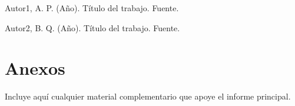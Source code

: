 \documentclass[12pt,a4paper]{article} \usepackage[spanish]{babel} \usepackage{graphicx} \usepackage{amsmath} \usepackage{amsfonts} \usepackage{amssymb} \usepackage{float} \usepackage{geometry}
\begin{document}
\begin{thebibliography}{99}

 Autor1, A. P. (Año). Título del trabajo. Fuente.

 Autor2, B. Q. (Año). Título del trabajo. Fuente.

\end{thebibliography}

\vspace{-1em} \hrulefill

\appendix

\section{Anexos}

Incluye aquí cualquier material complementario que apoye el informe principal.
\end{document}
